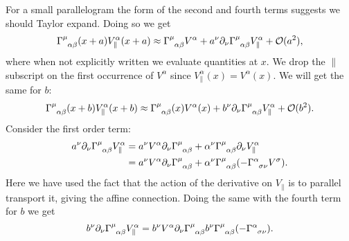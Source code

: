 \documentclass[fleqn]{NotesClass}
\newcommand*{\christoffel}[3]{\tensor{\Gamma}{^{#1}_{{#2}{#3}}}}
\newcommand*{\order}{\mathcal{O}}
\begin{document}
    For a small parallelogram the form of the second and fourth terms suggests we should Taylor expand.
    Doing so we get
    \begin{equation}
        \christoffel{\mu}{\alpha}{\beta} (x + a) V_{\|}^{\alpha} (x + a) \approx \christoffel{\mu}{\alpha}{\beta} V^\alpha + a^\nu \partial_\nu \christoffel{\mu}{\alpha}{\beta}V_{\|}^{\alpha} + \order(a^2),
    \end{equation}
    where when not explicitly written we evaluate quantities at \(x\).
    We drop the \(\|\) subscript on the first occurrence of \(V^\alpha\) since \(V_{\|}^\alpha(x) = V^\alpha(x)\).
    We will get the same for \(b\):
    \begin{equation}
        \christoffel{\mu}{\alpha}{\beta}(x + b)V_{\|}^\alpha(x + b) \approx \christoffel{\mu}{\alpha}{\beta}(x) V^\alpha(x) + b^\nu \partial_\nu \christoffel{\mu}{\alpha}{\beta} V_{\|}^\alpha + \order(b^2).
    \end{equation}
    Consider the first order term:
    \begin{align}
        a^\nu \partial_\nu \christoffel{\mu}{\alpha}{\beta}V_{\|}^{\alpha} &= a^\nu V^\alpha \partial_\nu \christoffel{\mu}{\alpha}{\beta} + \alpha^\nu \christoffel{\mu}{\alpha}{\beta} \partial_\nu V_{\|}^\alpha\\
        &= a^\nu V^\alpha \partial_\nu \christoffel{\mu}{\alpha}{\beta} + \alpha^\nu \christoffel{\mu}{\alpha}{\beta} (-\christoffel{\alpha}{\sigma}{\nu} V^\sigma).
    \end{align}
    Here we have used the fact that the action of the derivative on \(V_{\|}\) is to parallel transport it, giving the affine connection.
    Doing the same with the fourth term for \(b\) we get
    \begin{equation}
        b^\nu \partial_\nu \christoffel{\mu}{\alpha}{\beta} V_{\|}^\alpha = b^\nu V^\alpha\partial_\nu \christoffel{\mu}{\alpha}{\beta} b^\nu \christoffel{\mu}{\alpha}{\beta}(-\christoffel{\alpha}{\sigma}{\nu}).
    \end{equation}
    
\end{document}

